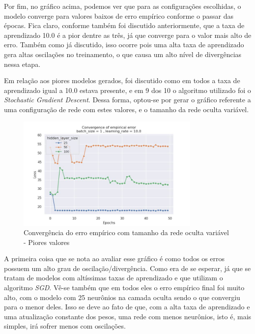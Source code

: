 \documentclass{article}
\begin{document}
Por fim, no gráfico acima, podemos ver que para as configurações escolhidas, o modelo converge para valores baixos de erro empírico conforme o passar das épocas.
Fica claro, conforme também foi discutido anteriormente, que a taxa de aprendizado 10.0 é a pior dentre as três, já que converge para o valor mais alto de erro. Também
como já discutido, isso ocorre pois uma alta taxa de aprendizado gera altas oscilações no treinamento, o que causa um alto nível de divergências nessa etapa.

Em relação aos piores modelos gerados, foi discutido como em todos a taxa de aprendizado igual a 10.0 estava presente, e em 9 dos 10 o algoritmo utilizado foi o \textit{Stochastic Gradient Descent}.
Dessa forma, optou-se por gerar o gráfico referente a uma configuração de rede com estes valores, e o tamanho da rede oculta variável.

\begin{figure}[H]
    \centering
    \includegraphics[width=0.8\textwidth]{images/empirical_error/hidden_layer_size_not_fixed_bad.jpg}
    \caption{Convergência do erro empírico com tamanho da rede oculta variável - Piores valores}
\end{figure}

A primeira coisa que se nota ao avaliar esse gráfico é como todos os erros possuem um alto grau de oscilação/divergência. Como era de se
esperar, já que se tratam de modelos com altíssimas taxas de aprendizado e que utilizam o algoritmo \textit{SGD}. Vê-se também
que em todos eles o erro empírico final foi muito alto, com o modelo com 25 neurônios na camada oculta sendo o que convergiu
para o menor deles. Isso se deve ao fato de que, com a alta taxa de aprendizado e uma atualização constante dos pesos, uma rede
com menos neurônios, isto é, mais simples, irá sofrer menos com oscilações.

\nocite{*}

\end{document}
